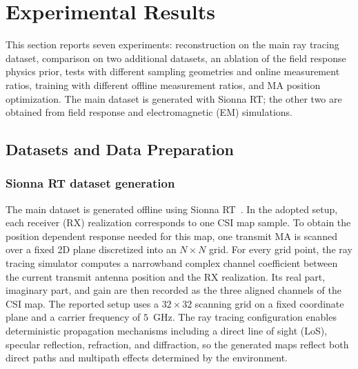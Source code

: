 \documentclass[lettersize,journal]{IEEEtran}
\begin{document}
\section{Experimental Results}
\label{sec:exp}

This section reports seven experiments: reconstruction on the main ray tracing dataset, comparison on two additional datasets, an ablation of the field response physics prior, tests with different sampling geometries and online measurement ratios, training with different offline measurement ratios, and MA position optimization. The main dataset is generated with Sionna RT; the other two are obtained from field response and electromagnetic (EM) simulations.

\subsection{Datasets and Data Preparation}

\subsubsection{Sionna RT dataset generation}
The main dataset is generated offline using Sionna RT~\cite{ref_sionna_rt}. In the adopted setup, each receiver (RX) realization corresponds to one CSI map sample. To obtain the position dependent response needed for this map, one transmit MA is scanned over a fixed 2D plane discretized into an $N\times N$ grid. For every grid point, the ray tracing simulator computes a narrowband complex channel coefficient between the current transmit antenna position and the RX realization. Its real part, imaginary part, and gain are then recorded as the three aligned channels of the CSI map. The reported setup uses a $32\times 32$ scanning grid on a fixed coordinate plane and a carrier frequency of $5$~GHz. The ray tracing configuration enables deterministic propagation mechanisms including a direct line of sight (LoS), specular reflection, refraction, and diffraction, so the generated maps reflect both direct paths and multipath effects determined by the environment.
\end{document}
